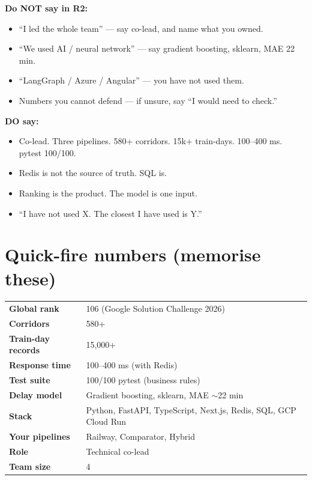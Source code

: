 \documentclass[11pt,a4paper]{article}
\newcommand{\card}[1]{%
  \par\vspace{4pt}%
  \noindent\colorbox{soft}{%
    \parbox{\dimexpr\textwidth-2\fboxsep}{\vspace{5pt}#1\vspace{5pt}}%
  }\par\vspace{5pt}%
}
\newcommand{\warn}[1]{%
  \par\vspace{4pt}%
  \noindent\colorbox{warnbg}{%
    \parbox{\dimexpr\textwidth-2\fboxsep}{\vspace{5pt}\textcolor{warnc}{#1}\vspace{5pt}}%
  }\par\vspace{5pt}%
}
\begin{document}
\warn{
\textbf{Do NOT say in R2:}
\begin{itemize}[leftmargin=1.1em, topsep=1pt, itemsep=1pt]
  \item ``I led the whole team'' --- say co-lead, and name what you owned.
  \item ``We used AI / neural network'' --- say gradient boosting, sklearn, MAE 22 min.
  \item ``LangGraph / Azure / Angular'' --- you have not used them.
  \item Numbers you cannot defend --- if unsure, say ``I would need to check.''
\end{itemize}
\textbf{DO say:}
\begin{itemize}[leftmargin=1.1em, topsep=1pt, itemsep=1pt]
  \item Co-lead. Three pipelines. 580+ corridors. 15k+ train-days. 100--400 ms. pytest 100/100.
  \item Redis is not the source of truth. SQL is.
  \item Ranking is the product. The model is one input.
  \item ``I have not used X. The closest I have used is Y.''
\end{itemize}
}

\section{Quick-fire numbers (memorise these)}

\card{
\begin{tabular}{@{}ll@{}}
\textbf{Global rank} & 106 (Google Solution Challenge 2026) \\
\textbf{Corridors} & 580+ \\
\textbf{Train-day records} & 15,000+ \\
\textbf{Response time} & 100--400 ms (with Redis) \\
\textbf{Test suite} & 100/100 pytest (business rules) \\
\textbf{Delay model} & Gradient boosting, sklearn, MAE $\sim$22 min \\
\textbf{Stack} & Python, FastAPI, TypeScript, Next.js, Redis, SQL, GCP Cloud Run \\
\textbf{Your pipelines} & Railway, Comparator, Hybrid \\
\textbf{Role} & Technical co-lead \\
\textbf{Team size} & 4 \\
\end{tabular}
}
\end{document}
